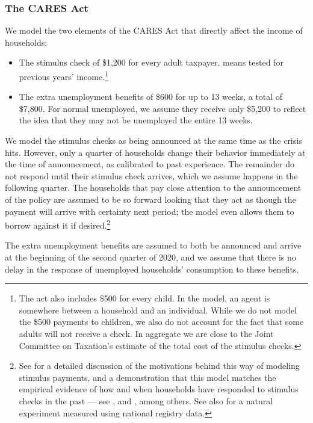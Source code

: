 \documentclass[titlepage,letterpaper]{\econtex}
\begin{document}
\subsubsection{The CARES Act}

We model the two elements of the CARES Act that directly affect the income of households:
\begin{itemize}
\item The stimulus check of \$1,200 for every adult taxpayer, means tested for previous years' income.\footnote{The act also includes \$500 for every child. In the model, an agent is somewhere between a household and an individual. While we do not model the \$500 payments to children, we also do not account for the fact that some adults will not receive a check. In aggregate we are close to the Joint Committee on Taxation's estimate of the total cost of the stimulus checks.}
\item The extra unemployment benefits of \$600 for up to 13 weeks, a total of \$7,800.
  For normal unemployed, we assume they receive only \$5,200 to reflect the idea that they may not be unemployed the entire 13 weeks.
\end{itemize}

We model the stimulus checks as being announced at the same time as the crisis hits.
However, only a quarter of households change their behavior immediately at the time of announcement, as calibrated to past experience.
The remainder do not respond until their stimulus check arrives, which we assume happens in the following quarter.
The households that pay close attention to the announcement of the policy are assumed to be so forward looking that they act as though the payment will arrive with certainty next period; the model even allows them to borrow against it if desired.\footnote{See \cite{carroll_sticky_2020} for a detailed discussion of the motivations behind this way of modeling stimulus payments, and a demonstration that this model matches the empirical evidence of how and when households have responded to stimulus checks in the past --- see \cite{psjmMPC2008}, \cite{brodaParker} and \cite{parker25million}, among others.  See also \cite{fhnMPC} for a natural experiment measured using national registry data.}

The extra unemployment benefits are assumed to both be announced and arrive at the beginning of the second quarter of 2020, and we assume that there is no delay in the response of unemployed households' consumption to these benefits.
\end{document}
